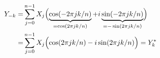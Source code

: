 \documentclass[a4paper, 12pt]{article}
\begin{document}
\begin{align*}
Y_{-k} =& \sum\limits_{j=0}^{n-1} X_j \Bigl( \underbrace{\cos(-2 \pi j k / n)}_{=\cos(2 \pi j k / n)} + i \underbrace{\sin(-2 \pi j k / n)}_{=-\sin(2 \pi j k / n)} \Bigr) \\
       =& \sum\limits_{j=0}^{n-1} X_j \Bigl( \cos(2 \pi j k / n) - i \sin(2 \pi j k / n) \Bigr) = Y^{*}_k
\end{align*}
\end{document}
